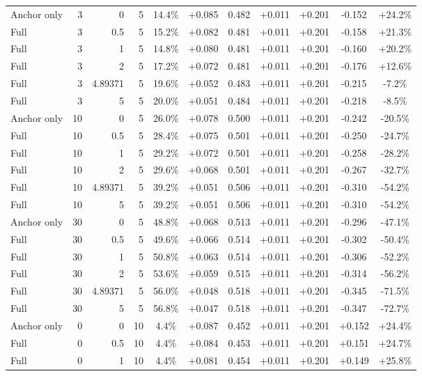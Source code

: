 \begin{table}[htbp]
\begin{tabular}{lrrrccccccc}
Anchor only & 3 & 0 & 5 & 14.4\% & +0.085 & 0.482 & +0.011 & +0.201 & -0.152 & +24.2\% \\
Full & 3 & 0.5 & 5 & 15.2\% & +0.082 & 0.481 & +0.011 & +0.201 & -0.158 & +21.3\% \\
Full & 3 & 1 & 5 & 14.8\% & +0.080 & 0.481 & +0.011 & +0.201 & -0.160 & +20.2\% \\
Full & 3 & 2 & 5 & 17.2\% & +0.072 & 0.481 & +0.011 & +0.201 & -0.176 & +12.6\% \\
Full & 3 & 4.89371 & 5 & 19.6\% & +0.052 & 0.483 & +0.011 & +0.201 & -0.215 & -7.2\% \\
Full & 3 & 5 & 5 & 20.0\% & +0.051 & 0.484 & +0.011 & +0.201 & -0.218 & -8.5\% \\
Anchor only & 10 & 0 & 5 & 26.0\% & +0.078 & 0.500 & +0.011 & +0.201 & -0.242 & -20.5\% \\
Full & 10 & 0.5 & 5 & 28.4\% & +0.075 & 0.501 & +0.011 & +0.201 & -0.250 & -24.7\% \\
Full & 10 & 1 & 5 & 29.2\% & +0.072 & 0.501 & +0.011 & +0.201 & -0.258 & -28.2\% \\
Full & 10 & 2 & 5 & 29.6\% & +0.068 & 0.501 & +0.011 & +0.201 & -0.267 & -32.7\% \\
Full & 10 & 4.89371 & 5 & 39.2\% & +0.051 & 0.506 & +0.011 & +0.201 & -0.310 & -54.2\% \\
Full & 10 & 5 & 5 & 39.2\% & +0.051 & 0.506 & +0.011 & +0.201 & -0.310 & -54.2\% \\
Anchor only & 30 & 0 & 5 & 48.8\% & +0.068 & 0.513 & +0.011 & +0.201 & -0.296 & -47.1\% \\
Full & 30 & 0.5 & 5 & 49.6\% & +0.066 & 0.514 & +0.011 & +0.201 & -0.302 & -50.4\% \\
Full & 30 & 1 & 5 & 50.8\% & +0.063 & 0.514 & +0.011 & +0.201 & -0.306 & -52.2\% \\
Full & 30 & 2 & 5 & 53.6\% & +0.059 & 0.515 & +0.011 & +0.201 & -0.314 & -56.2\% \\
Full & 30 & 4.89371 & 5 & 56.0\% & +0.048 & 0.518 & +0.011 & +0.201 & -0.345 & -71.5\% \\
Full & 30 & 5 & 5 & 56.8\% & +0.047 & 0.518 & +0.011 & +0.201 & -0.347 & -72.7\% \\
Anchor only & 0 & 0 & 10 & 4.4\% & +0.087 & 0.452 & +0.011 & +0.201 & +0.152 & +24.4\% \\
Full & 0 & 0.5 & 10 & 4.4\% & +0.084 & 0.453 & +0.011 & +0.201 & +0.151 & +24.7\% \\
Full & 0 & 1 & 10 & 4.4\% & +0.081 & 0.454 & +0.011 & +0.201 & +0.149 & +25.8\% \\

\end{tabular}
\end{table}
